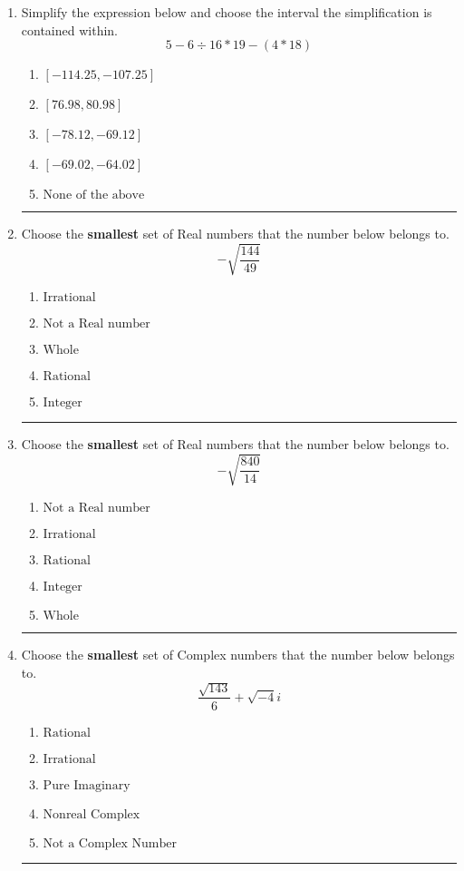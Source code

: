 \documentclass[14pt]{extbook}
\newcommand{\litem}[1]{\item#1\hspace*{-1cm}\rule{\textwidth}{0.4pt}}
\begin{document}
\begin{enumerate}
\litem{
Simplify the expression below and choose the interval the simplification is contained within.\[ 5 - 6 \div 16 * 19 - (4 * 18) \]\begin{enumerate}[label=\Alph*.]
\item \( [-114.25, -107.25] \)
\item \( [76.98, 80.98] \)
\item \( [-78.12, -69.12] \)
\item \( [-69.02, -64.02] \)
\item \( \text{None of the above} \)

\end{enumerate} }
\litem{
Choose the \textbf{smallest} set of Real numbers that the number below belongs to.\[ -\sqrt{\frac{144}{49}} \]\begin{enumerate}[label=\Alph*.]
\item \( \text{Irrational} \)
\item \( \text{Not a Real number} \)
\item \( \text{Whole} \)
\item \( \text{Rational} \)
\item \( \text{Integer} \)

\end{enumerate} }
\litem{
Choose the \textbf{smallest} set of Real numbers that the number below belongs to.\[ -\sqrt{\frac{840}{14}} \]\begin{enumerate}[label=\Alph*.]
\item \( \text{Not a Real number} \)
\item \( \text{Irrational} \)
\item \( \text{Rational} \)
\item \( \text{Integer} \)
\item \( \text{Whole} \)

\end{enumerate} }
\litem{
Choose the \textbf{smallest} set of Complex numbers that the number below belongs to.\[ \frac{\sqrt{143}}{6}+\sqrt{-4}i \]\begin{enumerate}[label=\Alph*.]
\item \( \text{Rational} \)
\item \( \text{Irrational} \)
\item \( \text{Pure Imaginary} \)
\item \( \text{Nonreal Complex} \)
\item \( \text{Not a Complex Number} \)


\end{enumerate}}
\end{enumerate}
\end{document}
